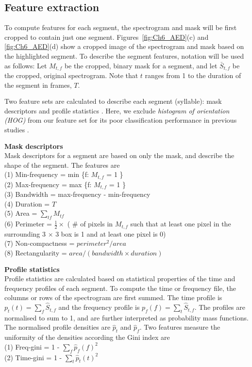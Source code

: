 \subsection{Feature extraction}
To compute features for each segment, the spectrogram and mask will be first cropped to contain just one segment. Figures~\ref{fig:Ch6_AED}(c) and \ref{fig:Ch6_AED}(d) show a cropped image of the spectrogram and mask based on the highlighted segment.
To describe the segment features, notation will be used as follows:
Let $M_{t,f}$ be the cropped, binary mask for a segment, and let $\bar{S}_{t,f}$ be the cropped, original spectrogram. Note that $t$ ranges from 1 to the duration of the segment in frames, $T$.



Two feature sets are calculated to describe each segment (syllable): mask descriptors and profile statistics \citep{briggs2012acoustic}. Here, we exclude \textit{histogram of orientation (HOG)} from our feature set for its poor classification performance in previous studies \citep{briggs2012acoustic, ruizmultiple2015}. 

\noindent \textbf{Mask descriptors}
\\
Mask descriptors for a segment are based on only the mask, and describe the shape of the segment. The features are
\\
\noindent (1) Min-frequency = min \{f: $M_{t,f}$ = 1 \} 
\\
\noindent (2) Max-frequency = max \{f: $M_{t,f}$ = 1 \}
\\
\noindent (3) Bandwidth = max-frequency - min-frequency
\\
\noindent (4) Duration = $T$
\\
\noindent (5) Area = $\sum_{tf}M_{tf}$
\\
\noindent (6) Perimeter = $\frac{1}{2} \times $ ( $\#$ of pixels in $M_{t,f}$ such that at least one pixel in the surrounding 3 $\times$ 3 box is 1 and at least one pixel is 0)
\\
\noindent (7) Non-compactness = $perimeter^{2}/area$
\\
\noindent (8) Rectangularity = $area/(bandwidth \times duration)$



\noindent \textbf{Profile statistics}
\\
Profile statistics are calculated based on statistical properties of the time and frequency profiles of each segment. 
To compute the time or frequency file, the columns or rows of the spectrogram are first summed.
The time profile is $p_{t}(t) = \sum_{f}\hat{S}_{t,f}$ and the frequency profile is $p_{f}(f) = \sum_{t}\hat{S}_{t,f}$. The profiles are normalised to sum to 1, and are further interpreted as probability mass functions. The normalised profile densities are $\hat{p}_{t}$ and $\hat{p}_{f}$.
Two features measure the uniformity of the densities according the Gini index are
\\
(1) Freq-gini = 1 - $\sum_{f}\hat{p}_{f}(f)^{2}$
\\
(2) Time-gini = 1 - $\sum_{t}\hat{p}_{t}(t)^{2}$

